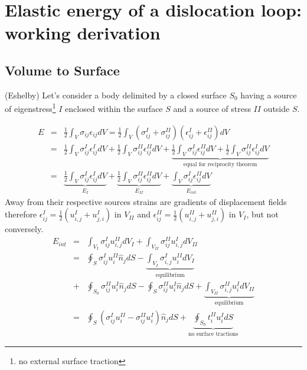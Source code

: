    
   

\section{Elastic energy of a dislocation loop: working derivation}
\subsection{Volume to Surface}
(Eshelby) Let's consider a body delimited by a closed surface $S_0$ having a source of eigenstress\footnote{ no external surface traction}  $I$ enclosed within the surface $S$ and a source of stress $II$ outside $S$.


\begin{eqnarray}
E&=&\frac{1}{2}\int_V\sigma_{ij}\epsilon_{ij}dV=\frac{1}{2}\int_V\left(\sigma^I_{ij}+\sigma^{II}_{ij}\right)\left(\epsilon^I_{ij}+\epsilon^{II}_{ij}\right)dV\nonumber\\
&=&\frac{1}{2}\int_V\sigma^I_{ij}\epsilon^{I}_{ij}dV+\frac{1}{2}\int_V\sigma^{II}_{ij}\epsilon^{II}_{ij}dV+\underbrace{\frac{1}{2}\int_V\sigma^{I}_{ij}\epsilon^{II}_{ij}dV+\frac{1}{2}\int_V\sigma^{II}_{ij}\epsilon^{I}_{ij}dV}_{\mbox{equal for reciprocity theorem}}\nonumber\\
&=&\underbrace{\frac{1}{2}\int_V\sigma^I_{ij}\epsilon^{I}_{ij}dV}_{E_I}+\underbrace{\frac{1}{2}\int_V\sigma^{II}_{ij}\epsilon^{II}_{ij}dV}_{E_{II}}+\underbrace{\int_V\sigma^{I}_{ij}\epsilon^{II}_{ij}dV}_{E_{int}}
\end{eqnarray}
Away from their respective sources strains are gradients of displacement fields therefore $\epsilon^{I}_{ij}=\frac{1}{2}\left(u^I_{i,j}+u^I_{j,i}\right)$ in $V_{II}$ and $\epsilon^{II}_{ij}=\frac{1}{2}\left(u^{II}_{i,j}+u^{II}_{j,i}\right)$ in $V_{I}$, but not conversely.
\begin{eqnarray}
E_{int}&=&\int_{V_I}\sigma^{I}_{ij}u^{II}_{i,j}dV_I+\int_{V_{II}}\sigma^{II}_{ij}u^{I}_{i,j}dV_{II}\nonumber\\
&=&\oint_{S}\sigma^{I}_{ij}u^{II}_{i}\hat{n}_jdS-\underbrace{\int_{V_I}\sigma^{I}_{i,j}u^{II}_{i}dV_I}_{\mbox{equilibrium}}\nonumber\\
&+&\oint_{S_0}\sigma^{II}_{ij}u^{I}_{i}\hat{n}_jdS-\oint_{S}\sigma^{II}_{ij}u^{I}_{i}\hat{n}_jdS+\underbrace{\int_{V_{II}}\sigma^{II}_{i,j}u^{I}_{i}dV_{II}}_{\mbox{equilibrium}}\nonumber\\
&=&\oint_{S}\left(\sigma^{I}_{ij}u^{II}_{i}-\sigma^{II}_{ij}u^{I}_{i}\right)\hat{n}_jdS+\underbrace{\oint_{S_0}t_i^{II}u_i^{I}dS}_{\mbox{no surface tractions}}
\end{eqnarray}


